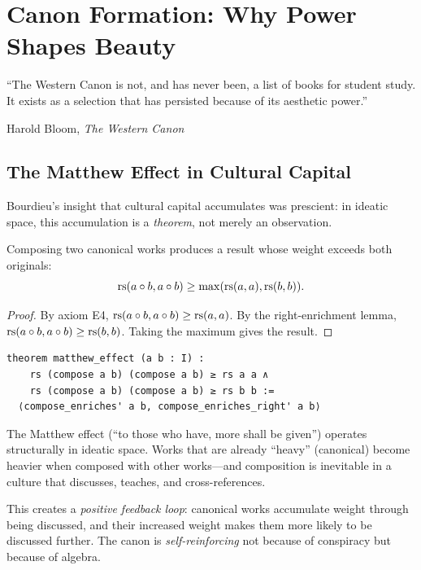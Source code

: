 
\chapter{Canon Formation: Why Power Shapes Beauty}
\label{ch:canon}

\epigraph{``The Western Canon is not, and has never been, a list of
books for student study.  It exists as a selection that has persisted
because of its aesthetic power.''}{Harold Bloom, \textit{The Western Canon}}

\section{The Matthew Effect in Cultural Capital}

Bourdieu's insight that cultural capital accumulates was prescient:
in ideatic space, this accumulation is a \emph{theorem}, not merely
an observation.

\begin{theorem}
\label{thm:matthew}
Composing two canonical works produces a result whose weight exceeds
both originals:
\[
  \mathrm{rs}(a \circ b, a \circ b) \geq \max(\mathrm{rs}(a, a), \mathrm{rs}(b, b)).
\]
\end{theorem}

\begin{proof}
By axiom E4, $\mathrm{rs}(a \circ b, a \circ b) \geq \mathrm{rs}(a, a)$.
By the right-enrichment lemma, $\mathrm{rs}(a \circ b, a \circ b) \geq \mathrm{rs}(b, b)$.
Taking the maximum gives the result.
\end{proof}

\begin{lstlisting}
theorem matthew_effect (a b : I) :
    rs (compose a b) (compose a b) ≥ rs a a ∧
    rs (compose a b) (compose a b) ≥ rs b b :=
  ⟨compose_enriches' a b, compose_enriches_right' a b⟩
\end{lstlisting}

\begin{remark}
The Matthew effect (``to those who have, more shall be given'') operates
structurally in ideatic space.  Works that are already ``heavy'' (canonical)
become heavier when composed with other works---and composition is
inevitable in a culture that discusses, teaches, and cross-references.

This creates a \emph{positive feedback loop}: canonical works accumulate
weight through being discussed, and their increased weight makes them
more likely to be discussed further.  The canon is \emph{self-reinforcing}
not because of conspiracy but because of algebra.
\end{remark}

